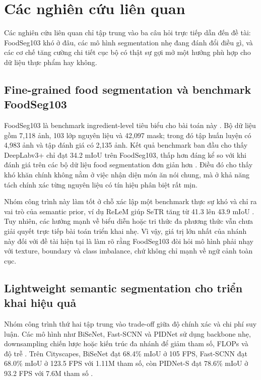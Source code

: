 \section{Các nghiên cứu liên quan}

Các nghiên cứu liên quan chỉ tập trung vào ba câu hỏi trực tiếp dẫn đến đề tài: FoodSeg103 khó ở đâu, các mô hình segmentation nhẹ đang đánh đổi điều gì, và các cơ chế tăng cường chi tiết cục bộ có thật sự gợi mở một hướng phù hợp cho dữ liệu thực phẩm hay không.

\subsection{Fine-grained food segmentation và benchmark FoodSeg103}

FoodSeg103 là benchmark ingredient-level tiêu biểu cho bài toán này \cite{benchmarkfood}. Bộ dữ liệu gồm 7{,}118 ảnh, 103 lớp nguyên liệu và 42{,}097 mask; trong đó tập huấn luyện có 4{,}983 ảnh và tập đánh giá có 2{,}135 ảnh. Kết quả benchmark ban đầu cho thấy DeepLabv3+ chỉ đạt 34.2 mIoU trên FoodSeg103, thấp hơn đáng kể so với khi đánh giá trên các bộ dữ liệu food segmentation đơn giản hơn \cite{benchmarkfood}. Điều đó cho thấy khó khăn chính không nằm ở việc nhận diện món ăn nói chung, mà ở khả năng tách chính xác từng nguyên liệu có tín hiệu phân biệt rất mịn.

Nhóm công trình này làm tốt ở chỗ xác lập một benchmark thực sự khó và chỉ ra vai trò của semantic prior, ví dụ ReLeM giúp SeTR tăng từ 41.3 lên 43.9 mIoU \cite{benchmarkfood}. Tuy nhiên, các hướng mạnh về biểu diễn hoặc tri thức đa phương thức vẫn chưa giải quyết trực tiếp bài toán triển khai nhẹ. Vì vậy, giá trị lớn nhất của nhánh này đối với đề tài hiện tại là làm rõ rằng FoodSeg103 đòi hỏi mô hình phải nhạy với texture, boundary và class imbalance, chứ không chỉ mạnh về ngữ cảnh toàn cục.

\subsection{Lightweight semantic segmentation cho triển khai hiệu quả}

Nhóm công trình thứ hai tập trung vào trade-off giữa độ chính xác và chi phí suy luận. Các mô hình như BiSeNet, Fast-SCNN và PIDNet sử dụng backbone nhẹ, downsampling chiến lược hoặc kiến trúc đa nhánh để giảm tham số, FLOPs và độ trễ \cite{bisenet,poudel2019fastscnn,xu2023pidnet}. Trên Cityscapes, BiSeNet đạt 68.4\% mIoU ở 105 FPS, Fast-SCNN đạt 68.0\% mIoU ở 123.5 FPS với 1.11M tham số, còn PIDNet-S đạt 78.6\% mIoU ở 93.2 FPS với 7.6M tham số \cite{bisenet,poudel2019fastscnn,xu2023pidnet}.

